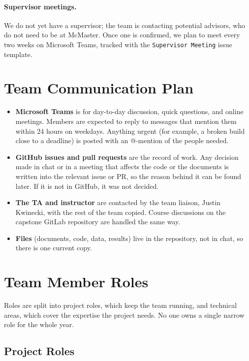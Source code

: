 \documentclass{article}
\begin{document}
\paragraph{Supervisor meetings.} We do not yet have a supervisor; the team
is contacting potential advisors, who do not need to be at McMaster. Once
one is confirmed, we plan to meet every two weeks on Microsoft Teams,
tracked with the \texttt{Supervisor Meeting} issue template.

\section{Team Communication Plan}

\begin{itemize}
  \item \textbf{Microsoft Teams} is for day-to-day discussion, quick
  questions, and online meetings. Members are expected to reply to
  messages that mention them within 24 hours on weekdays. Anything urgent
  (for example, a broken build close to a deadline) is posted with an
  @-mention of the people needed.
  \item \textbf{GitHub issues and pull requests} are the record of work.
  Any decision made in chat or in a meeting that affects the code or the
  documents is written into the relevant issue or PR, so the reason
  behind it can be found later. If it is not in GitHub, it was not
  decided.
  \item \textbf{The TA and instructor} are contacted by the team liaison,
  Justin Kwinecki, with the rest of the team copied. Course discussions on
  the capstone GitLab repository are handled the same way.
  \item \textbf{Files} (documents, code, data, results) live in the
  repository, not in chat, so there is one current copy.
\end{itemize}

\section{Team Member Roles}
\label{sec:roles}

Roles are split into project roles, which keep the team running, and
technical areas, which cover the expertise the project needs. No one owns a
single narrow role for the whole year.

\subsection{Project Roles}
\end{document}
